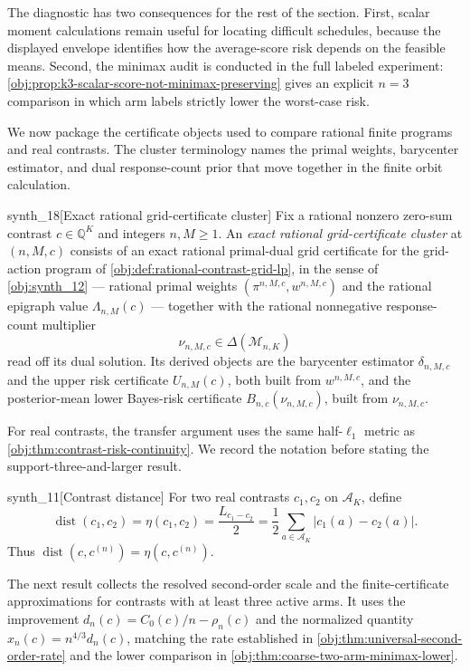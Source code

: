 \documentclass[11pt]{article}
\begin{document}
The diagnostic has two consequences for the rest of the section. First, scalar moment calculations remain useful for locating difficult schedules, because the displayed envelope identifies how the average-score risk depends on the feasible means. Second, the minimax audit is conducted in the full labeled experiment: \cref{obj:prop:k3-scalar-score-not-minimax-preserving} gives an explicit \(n=3\) comparison in which arm labels strictly lower the worst-case risk.

We now package the certificate objects used to compare rational finite programs and real contrasts. The cluster terminology names the primal weights, barycenter estimator, and dual response-count prior that move together in the finite orbit calculation.

\begin{definitionv}{synth_18}[Exact rational grid-certificate cluster]
Fix a rational nonzero zero-sum contrast \(c\in\mathbb Q^K\) and integers \(n,M\ge1\). An \emph{exact rational grid-certificate cluster} at \((n,M,c)\) consists of an exact rational primal-dual grid certificate for the grid-action program of \cref{obj:def:rational-contrast-grid-lp}, in the sense of \cref{obj:synth_12} --- rational primal weights \((\pi^{n,M,c},w^{n,M,c})\) and the rational epigraph value \(\Lambda_{n,M}(c)\) --- together with the rational nonnegative response-count multiplier
\[
\nu_{n,M,c}\in\Delta(\mathcal M_{n,K})
\]
read off its dual solution. Its derived objects are the barycenter estimator \(\delta_{n,M,c}\) and the upper risk certificate \(U_{n,M}(c)\), both built from \(w^{n,M,c}\), and the posterior-mean lower Bayes-risk certificate \(B_{n,c}(\nu_{n,M,c})\), built from \(\nu_{n,M,c}\).
\end{definitionv}

For real contrasts, the transfer argument uses the same half-\(\ell_1\) metric as \cref{obj:thm:contrast-risk-continuity}. We record the notation before stating the support-three-and-larger result.

\begin{definitionv}{synth_11}[Contrast distance]
For two real contrasts $c_1,c_2$ on $\mathcal A_K$, define
\[
\operatorname{dist}(c_1,c_2)=\eta(c_1,c_2)=\frac{L_{c_1-c_2}}2=\frac12\sum_{a\in\mathcal A_K}|c_1(a)-c_2(a)|.
\]
Thus $\operatorname{dist}(c,c^{(n)})=\eta(c,c^{(n)})$.
\end{definitionv}

The next result collects the resolved second-order scale and the finite-certificate approximations for contrasts with at least three active arms. It uses the improvement \(d_n(c)=C_0(c)/n-\rho_n(c)\) and the normalized quantity \(x_n(c)=n^{4/3}d_n(c)\), matching the rate established in \cref{obj:thm:universal-second-order-rate} and the lower comparison in \cref{obj:thm:coarse-two-arm-minimax-lower}.
\end{document}
